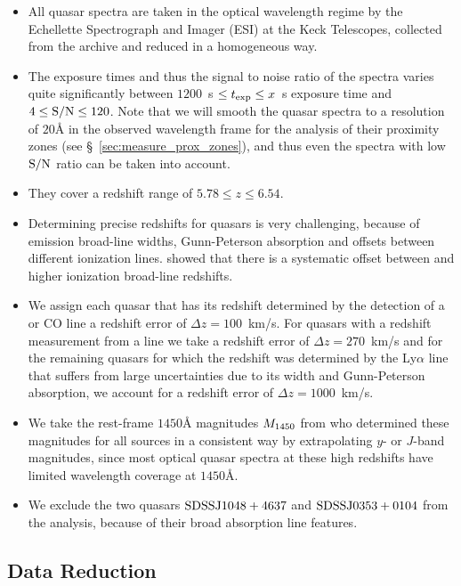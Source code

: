 \documentclass[iop]{emulateapj}
\newcommand{\lya} {Ly$\alpha$\xspace}
\newcommand{\cii} {\ion{C}{2}\xspace}
\newcommand{\mgii} {\ion{Mg}{2}\xspace}
\begin{document}
\begin{itemize}
\item All quasar spectra are taken in the optical wavelength regime by the Echellette Spectrograph and Imager (ESI) at the Keck Telescopes, collected from the archive and reduced in a homogeneous way. 
\item The exposure times and thus the signal to noise ratio of the spectra varies quite significantly between $1200$~s $\leq t_{\rm exp}\leq x$~s exposure time and $4\leq \rm S/N \leq 120$. Note that we will smooth the quasar spectra to a resolution of $20${\AA} in the observed wavelength frame for the analysis of their proximity zones (see \S~\ref{sec:measure_prox_zones}), and thus even the spectra with low $\rm S/N$ ratio can be taken into account. 
\item They cover a redshift range of $5.78\leq z \leq 6.54$. 
\item Determining precise redshifts for quasars is very challenging, because of emission broad-line widths, Gunn-Peterson absorption and offsets between different ionization lines. \citet{Venemans2016} showed that there is a systematic offset between \mgii and higher ionization broad-line redshifts. 
\item We assign each quasar that has its redshift determined by the detection of a \cii or CO line a redshift error of $\Delta z=100$~km/s. For quasars with a redshift measurement from a \mgii line we take a redshift error of $\Delta z=270$~km/s and for the remaining quasars for which the redshift was determined by the \lya line that suffers from large uncertainties due to its width and Gunn-Peterson absorption, we account for a redshift error of $\Delta z=1000$~km/s. 
\item We take the rest-frame $1450${\AA} magnitudes $M_{\rm 1450}$ from \citet{Banados2016} who determined these magnitudes for all sources in a consistent way by extrapolating $y$- or $J$-band magnitudes, since most optical quasar spectra at these high redshifts have limited wavelength coverage at $1450${\AA}. 
\item We exclude the two quasars $\rm SDSSJ1048+4637$ and $\rm SDSSJ0353+0104$ from the analysis, because of their broad absorption line features. 
\end{itemize}

\subsection{Data Reduction}
\end{document}
